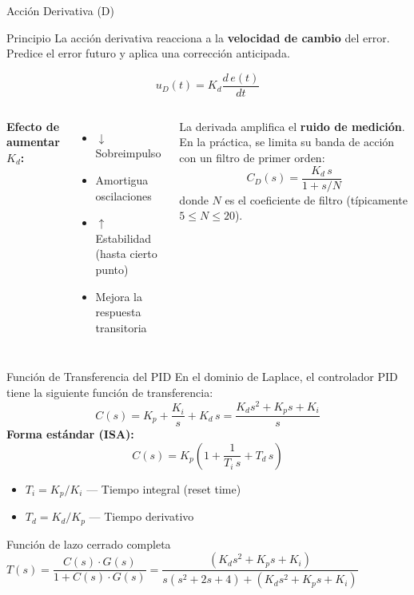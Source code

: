 \documentclass[aspectratio=169,xcolor=dvipsnames]{beamer}
\begin{document}
\begin{frame}{Acción Derivativa (D)}
    \footnotesize
    \begin{block}{Principio}
        La acción derivativa reacciona a la \textbf{velocidad de cambio} del error. Predice el error futuro y aplica una corrección anticipada.
    \end{block}
    \begin{equation}
        u_D(t) = K_d \frac{d\,e(t)}{dt}
    \end{equation}
    \begin{columns}
        \textbf{Efecto de aumentar $K_d$:}
        \begin{itemize}
            \item $\downarrow$ Sobreimpulso
            \item Amortigua oscilaciones
            \item $\uparrow$ Estabilidad (hasta cierto punto)
            \item Mejora la respuesta transitoria
        \end{itemize}
        \begin{alertblock}{}
            La derivada amplifica el \textbf{ruido de medición}. En la práctica, se limita su banda de acción con un filtro de primer orden:
            \[C_D(s) = \frac{K_d \, s}{1 + s/N}\]
            donde $N$ es el coeficiente de filtro (típicamente $5 \leq N \leq 20$).
        \end{alertblock}
    \end{columns}
\end{frame}

\begin{frame}{Función de Transferencia del PID}
    \footnotesize
    En el dominio de Laplace, el controlador PID tiene la siguiente función de transferencia:
    \begin{equation}
        C(s) = K_p + \frac{K_i}{s} + K_d \, s = \frac{K_d s^2 + K_p s + K_i}{s}
    \end{equation}
    \vspace{0.3em}
    \textbf{Forma estándar (ISA):}
    \begin{equation}
        C(s) = K_p \left(1 + \frac{1}{T_i \, s} + T_d \, s\right)
    \end{equation}
    \begin{itemize}
        \item $T_i = K_p / K_i$ \quad --- Tiempo integral (reset time)
        \item $T_d = K_d / K_p$ \quad --- Tiempo derivativo
    \end{itemize}
    \vspace{0.2em}
    \begin{exampleblock}{Función de lazo cerrado completa}
        \centering
        $T(s) = \dfrac{C(s)\cdot G(s)}{1 + C(s)\cdot G(s)} = \dfrac{(K_d s^2 + K_p s + K_i)}{s(s^2+2s+4) + (K_d s^2 + K_p s + K_i)}$
    \end{exampleblock}
\end{frame}
\end{document}
